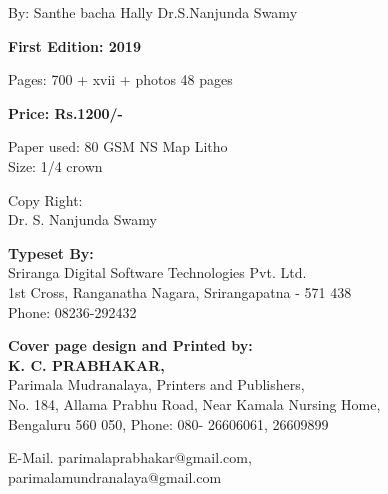 


By: Santhe bacha Hally Dr.S.Nanjunda Swamy


\begin{center}
\textbf{First Edition: 2019}
\end{center}

\begin{center}
Pages: 700 + xvii + photos 48 pages
\end{center}

\begin{center}
\textbf{Price: Rs.1200/-}
\end{center}

\begin{center}
Paper used: 80 GSM NS Map Litho\\ Size: 1/4 crown
\end{center}

\begin{center}
Copy Right:\\ Dr. S. Nanjunda Swamy
\end{center}

\begin{center}
\textbf{Typeset By:}\\ Sriranga Digital Software Technologies Pvt. Ltd.\\ 1st Cross, Ranganatha Nagara, Srirangapatna - 571 438\\ Phone: 08236-292432
\end{center}

\begin{center}
\textbf{Cover page design and Printed by:}\\\textbf{K. C. PRABHAKAR,}\\ Parimala Mudranalaya, Printers and Publishers,\\ No. 184, Allama Prabhu Road, Near Kamala Nursing Home,\\ Bengaluru 560 050, Phone: 080- 26606061, 26609899
\end{center}

\begin{center}
E-Mail. parimalaprabhakar@gmail.com,\\ parimalamundranalaya@gmail.com
\end{center}

